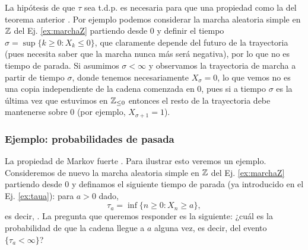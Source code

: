 \begin{ex}
La hipótesis de que $\tau$ sea t.d.p. es necesaria para que una propiedad como la del teorema anterior .
Por ejemplo podemos considerar la marcha aleatoria simple en $\mathbb{Z}$ del Ej. \ref{ex:marchaZ} partiendo desde $0$ y definir el tiempo $\sigma=\sup\{k\geq0\!:X_k\leq0\}$, que claramente depende del futuro de la trayectoria (pues necesita saber que la marcha nunca más será negativa), por lo que no es tiempo de parada.
Si asumimos $\sigma<\infty$ y observamos la trayectoria de marcha a partir de tiempo $\sigma$, donde tenemos necesariamente $X_\sigma=0$, lo que vemos no es una copia independiente de la cadena comenzada en $0$, pues si a tiempo $\sigma$ es la última vez que estuvimos en $\mathbb{Z}_{\leq0}$ entonces el resto de la trayectoria debe mantenerse sobre $0$ (por ejemplo, $X_{\sigma+1}=1$).
\end{ex}

\subsubsection{Ejemplo: probabilidades de pasada}\label{sec:pasada}

La propiedad de Markov fuerte .
Para ilustrar esto veremos un ejemplo.
Consideremos de nuevo la marcha aleatoria simple en $\mathbb{Z}$ del Ej. \ref{ex:marchaZ} partiendo desde $0$ y definamos el siguiente tiempo de parada (ya introducido en el Ej. \ref{ex:taua}): para $a>0$ dado,
\[\tau_{a}=\inf\{n\geq0\!:X_n\geq a\},\]
es decir, .
La pregunta que queremos responder es la siguiente: ¿cuál es la probabilidad de que la cadena llegue a $a$ alguna vez, es decir, del evento $\{\tau_a<\infty\}$?

